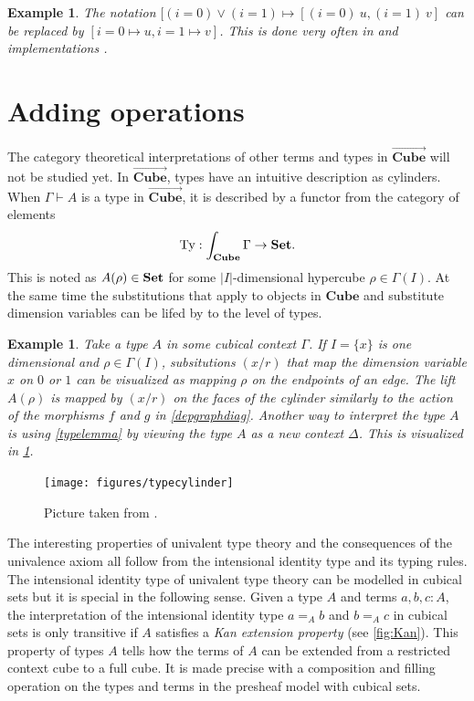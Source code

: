 \documentclass[12pt,a4paper,twoside,xetex]{book} %
\newcommand{\keyword}[1]{\emph{#1}\index{#1}}
\newtheorem{example}[theorem]{Example}
\newcommand{\psh}[1]{\overrightarrow{#1}}
\newcommand{\cube}[0]{\textbf{Cube}}
\begin{document}
\begin{example}
The notation $[(i = 0) \vee (i=1) \mapsto [(i=0) \ u, (i=1)\  v]$ can 
be replaced by $[i=0 \mapsto u, i=1 \mapsto v]$. This is done very often in 
\cite{Huber2016} and implementations \cite{Moertberg2018}.
\end{example}






\section{Adding operations}\label{extraops}

The category theoretical interpretations of other 
terms and types in $\psh{\cube}$ will not be studied yet. In $\psh{\cube}$, types have an intuitive description as cylinders. When $\Gamma \vdash A$ is a type in $\psh{\cube}$, it is described by a functor from the category of elements 
$$\text{Ty}:\int_{\cube} \Gamma \rightarrow \set.$$ This is noted as $A(\rho) \in \text{\textbf{Set}}$ for some $|I|$-dimensional hypercube $\rho 
\in \Gamma (I)$. At the same time the substitutions that apply to objects in $\cube$ and substitute dimension variables can 
be lifed by  to the level of types. 

\begin{example}
Take a type $A$ in some cubical context $\Gamma$. If $I=\{x\}$ is one dimensional and $\rho \in \Gamma(I)$, subsitutions $(x/r)$ that 
map the dimension variable $x$ on $0$ or $1$ can be visualized as mapping $\rho$ on the endpoints of an edge. The lift $A(\rho)$ is mapped by $(x/r)$ on the faces of the 
cylinder similarly to the action of the morphisms $f$ and $g$ in \cref{depgraphdiag}. Another way to interpret the type $A$ is using \cref{typelemma} by viewing the type $A$ as a new context $\Delta$.  This is visualized in \cref{hubtypes}. 
\end{example}

\begin{figure}\label{hubtypes}
 \centering
 \texttt{[image: figures/typecylinder]}
 \caption{Picture taken from \cite{Huber2016def}.}
\end{figure}

The interesting properties of univalent type theory and the 
consequences of the univalence axiom all follow from the intensional identity 
type and its typing rules. The intensional identity type of univalent type 
theory can be modelled in cubical sets but it is special in the following 
sense. Given a type $A$ and terms $a,b,c:A$, the interpretation of the 
intensional identity type $a =_A b$ and $b=_A c$  in cubical sets is only 
transitive if $A$ satisfies a \keyword{Kan extension property} (see 
\cref{fig:Kan}). This property of types $A$ tells how the terms of $A$ can be 
extended from a restricted context cube to a full cube. It is made precise with 
a composition and filling operation on the types and terms in the presheaf 
model with cubical sets.
\end{document}
